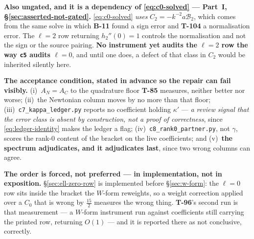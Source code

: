 \textbf{Also ungated, and it is a dependency of
\eqref{eq:c0-solved} --- Part~I, \S\ref{sec:asserted-not-gated}.} \eqref{eq:c0-solved} \emph{uses}
$C_2=-k^{-2}a\mathcal B_2$, which comes from the same solve in which
\textbf{B-11} found a sign error and \textbf{T-104} a normalisation error. The
$\ell=2$ row returning $h_2''(0)=1$ controls the normalisation and not the
sign or the source pairing. \textbf{No instrument yet audits the $\ell=2$ row
the way \texttt{c5} audits $\ell=0$}, and until one does, a defect of that
class in $C_2$ would be inherited silently here.

\textbf{The acceptance condition, stated in advance so the repair can fail
visibly.} (i)~$A_N=A_C$ to the quadrature floor \textbf{T-85} measures, neither
better nor worse; (ii)~the Newtonian column moves by no more than that floor;
(iii)~\texttt{c7\_kappa\_ledger.py} reports no coefficient holding $\kappa'$
--- \emph{a review signal that the error class is absent by construction, not a
proof of correctness}, since \eqref{eq:ledger-identity} makes the ledger a flag;
(iv)~\texttt{c8\_rank0\_partner.py}, not $\gamma$, scores the rank-0 content of
the bracket on the live coefficients; and (v)~\textbf{the spectrum adjudicates,
and it adjudicates last}, since two wrong columns can agree.

\textbf{The order is forced, not preferred --- in implementation, not in
exposition.} \S\ref{sec:ell-zero-row} is implemented before
\S\ref{sec:w-form}: the $\ell=0$ row sits inside the bracket the $W$-form
reweights, so a weight correction applied over a $C_0$ that is wrong by
$\tfrac{15}2$ measures the wrong thing. \textbf{T-96}'s second run is that
measurement --- a $W$-form instrument run against coefficients still carrying
the printed row, returning $O(1)$ --- and it is reported there as not
conclusive, correctly.
